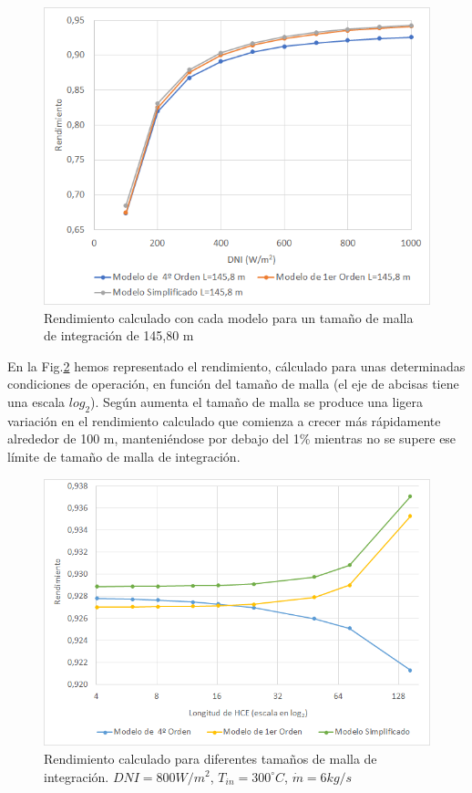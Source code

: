 \begin{figure}[H]
\includegraphics[width=0.9\linewidth]{images/malla14580.png}
\caption{Rendimiento calculado con cada modelo para un tamaño de malla de integración de 145,80 m} 
\label{fig:malla14580}
\end{figure}

En la Fig.\ref{fig:malla_variable_DNI_800} hemos representado el rendimiento, cálculado para unas determinadas condiciones de operación, en función del tamaño de malla (el eje de abcisas tiene una escala $log_2$). Según aumenta el tamaño de malla se produce una ligera variación en el rendimiento calculado que comienza a crecer más rápidamente alrededor de 100 m, manteniéndose por debajo del 1\% mientras no se supere ese límite de tamaño de malla de integración. 

\begin{figure}[H]
\includegraphics[width=0.9\linewidth]{images/malla_variable_DNI_800.png}
\caption{Rendimiento calculado para diferentes tamaños de malla de integración. $DNI=800 W/m^2$, $T_{in}=300 ^\circ C$, $\dot m = 6 kg/s$} 
\label{fig:malla_variable_DNI_800}
\end{figure}

